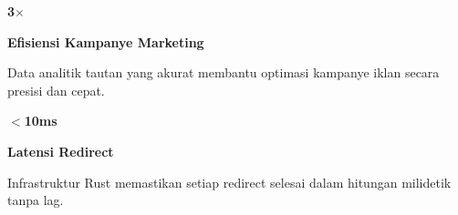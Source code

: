 \documentclass[a4paper]{article}
\begin{document}
\noindent
\begin{minipage}[t]{0.485\textwidth}
    \noindent\colorbox{BlueBg}{%
        \begin{minipage}[t]{\dimexpr\linewidth-2\fboxsep}
            \vspace{6pt}
            {\fontsize{20}{24}\selectfont\bfseries\color{CyanPrimary} 3$\times$}\par\vspace{2pt}
            {\fontsize{9.5}{12}\selectfont\bfseries\color{BlueDark} Efisiensi Kampanye Marketing}\par\vspace{2pt}
            {\fontsize{8.5}{11}\selectfont\color{TextDark}Data analitik tautan yang akurat membantu optimasi kampanye iklan secara presisi dan cepat.}%
            \vspace{6pt}
        \end{minipage}}%
    \vspace{6pt}
    \noindent\colorbox{BlueBg}{%
        \begin{minipage}[t]{\dimexpr\linewidth-2\fboxsep}
            \vspace{6pt}
            {\fontsize{20}{24}\selectfont\bfseries\color{CyanPrimary} $<$10ms}\par\vspace{2pt}
            {\fontsize{9.5}{12}\selectfont\bfseries\color{BlueDark} Latensi Redirect}\par\vspace{2pt}
            {\fontsize{8.5}{11}\selectfont\color{TextDark}Infrastruktur Rust memastikan setiap redirect selesai dalam hitungan milidetik tanpa lag.}%
            \vspace{6pt}
        \end{minipage}}%
\end{minipage}%
\hfill
\end{document}
